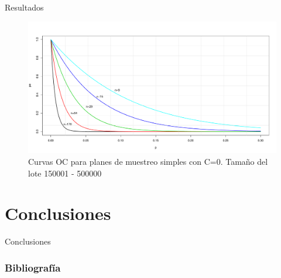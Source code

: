 \documentclass[10pt]{beamer}
\begin{document}
\begin{frame}{Resultados}
\begin{figure}[h!]
  \centering
  \includegraphics[scale=0.33]{FigurasUV/CO14.pdf}
  \caption{Curvas OC para planes de muestreo simples con C=0. Tamaño del lote 150001 - 500000}
\end{figure}
\end{frame}

















\section{Conclusiones}
\begin{frame}{Conclusiones}

\end{frame}


\begin{frame}
  \frametitle{Bibliografía}
  
\nocite{A0}
  
  
  
\end{frame}
\end{document}
